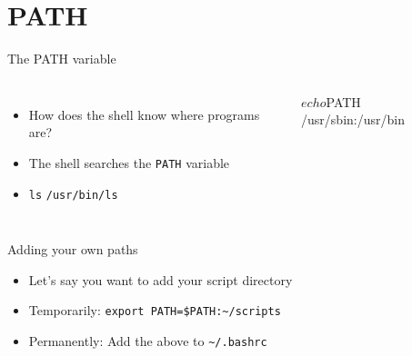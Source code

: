     \section{PATH}

    \begin{frame}[t,fragile]{The PATH variable}
        \begin{columns}[T]
            \begin{itemize}
                \item How does the shell know where programs are?
                \item The shell searches the \texttt{PATH} variable
                \item \texttt{ls} \textrightarrow \: \texttt{/usr/bin/ls}
            \end{itemize}
            \begin{bashenv}$ echo $PATH
/usr/sbin:/usr/bin
            \end{bashenv}
        \end{columns}
    \end{frame}

    \begin{frame}[t,fragile]{Adding your own paths}
        \begin{itemize}
            \item Let's say you want to add your script directory
            \item Temporarily: \texttt{export PATH=\$PATH:\textasciitilde/scripts}
            \item Permanently: Add the above to \texttt{\textasciitilde/.bashrc}
        \end{itemize}
    \end{frame}

